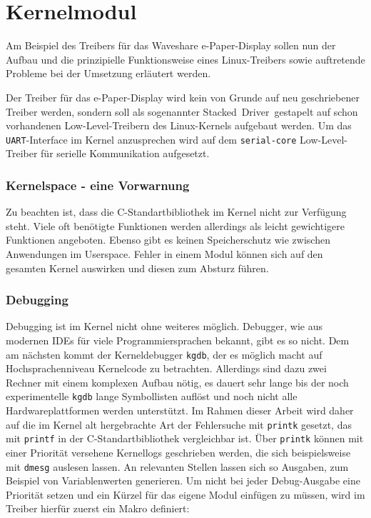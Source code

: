 
\chapter{Kernelmodul} 
Am Beispiel des Treibers für das Waveshare e-Paper-Display sollen nun der Aufbau und die prinzipielle Funktionsweise eines Linux-Treibers sowie auftretende Probleme bei der Umsetzung erläutert werden. 

Der Treiber für das e-Paper-Display wird kein von Grunde auf neu geschriebener Treiber werden, sondern soll als sogenannter \glqq Stacked~Driver\grqq~gestapelt auf schon vorhandenen Low-Level-Treibern des Linux-Kernels aufgebaut werden. 
Um das \texttt{UART}-Interface im Kernel anzusprechen wird auf dem \texttt{serial-core} Low-Level-Treiber für serielle Kommunikation aufgesetzt. 

\subsection{Kernelspace - eine Vorwarnung}
Zu beachten ist, dass die C-Standartbibliothek im Kernel nicht zur Verfügung steht. Viele oft benötigte Funktionen werden allerdings als leicht gewichtigere Funktionen angeboten. Ebenso gibt es keinen Speicherschutz wie zwischen Anwendungen im Userspace. Fehler in einem Modul können sich auf den gesamten Kernel auswirken und diesen zum Absturz führen. 

\subsection{Debugging}
Debugging ist im Kernel nicht ohne weiteres möglich. Debugger, wie aus modernen IDEs für viele Programmiersprachen bekannt, gibt es so nicht. Dem am nächsten kommt der Kerneldebugger \texttt{kgdb}, der es möglich macht auf Hochsprachenniveau Kernelcode zu betrachten. Allerdings sind dazu zwei Rechner mit einem komplexen Aufbau nötig, es dauert sehr lange bis der noch experimentelle \texttt{kgdb} lange Symbollisten auflöst und noch nicht alle Hardwareplattformen werden unterstützt. %
Im Rahmen dieser Arbeit wird daher auf die im Kernel alt hergebrachte Art der Fehlersuche mit \texttt{printk} gesetzt, das mit \texttt{printf} in der C-Standartbibliothek vergleichbar ist. Über \texttt{printk} können mit einer Priorität versehene Kernellogs geschrieben werden, die sich beispielsweise mit \texttt{dmesg} auslesen lassen. An relevanten Stellen lassen sich so Ausgaben, zum Beispiel von Variablenwerten generieren. Um nicht bei jeder Debug-Ausgabe eine Priorität setzen und ein Kürzel für das eigene Modul einfügen zu müssen, wird im Treiber hierfür zuerst ein Makro definiert:

